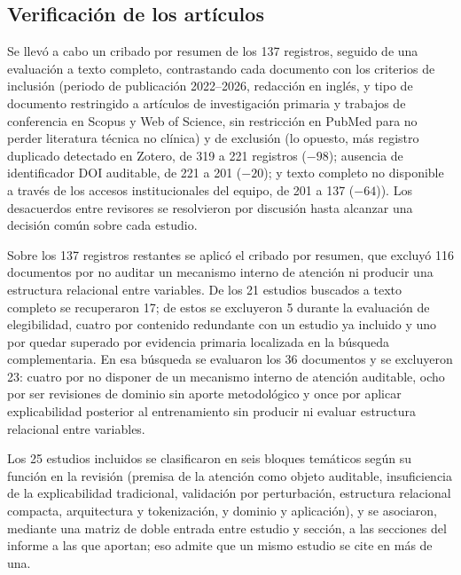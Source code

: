 \subsection{Verificación de los artículos}
\label{subsec:verificacion}

Se llevó a cabo un cribado por resumen de los 137 registros, seguido de una evaluación a texto completo, contrastando cada documento con los criterios de inclusión (periodo de publicación 2022--2026, redacción en inglés, y tipo de documento restringido a artículos de investigación primaria y trabajos de conferencia en Scopus y Web of Science, sin restricción en PubMed para no perder literatura técnica no clínica) y de exclusión (lo opuesto, más registro duplicado detectado en Zotero, de 319 a 221 registros ($-98$); ausencia de identificador DOI auditable, de 221 a 201 ($-20$); y texto completo no disponible a través de los accesos institucionales del equipo, de 201 a 137 ($-64$)). Los desacuerdos entre revisores se resolvieron por discusión hasta alcanzar una decisión común sobre cada estudio.

Sobre los 137 registros restantes se aplicó el cribado por resumen, que excluyó 116 documentos por no auditar un mecanismo interno de atención ni producir una estructura relacional entre variables. De los 21 estudios buscados a texto completo se recuperaron 17; de estos se excluyeron 5 durante la evaluación de elegibilidad, cuatro por contenido redundante con un estudio ya incluido y uno por quedar superado por evidencia primaria localizada en la búsqueda complementaria. En esa búsqueda se evaluaron los 36 documentos y se excluyeron 23: cuatro por no disponer de un mecanismo interno de atención auditable, ocho por ser revisiones de dominio sin aporte metodológico y once por aplicar explicabilidad posterior al entrenamiento sin producir ni evaluar estructura relacional entre variables.

Los 25 estudios incluidos se clasificaron en seis bloques temáticos según su función en la revisión (premisa de la atención como objeto auditable, insuficiencia de la explicabilidad tradicional, validación por perturbación, estructura relacional compacta, arquitectura y tokenización, y dominio y aplicación), y se asociaron, mediante una matriz de doble entrada entre estudio y sección, a las secciones del informe a las que aportan; eso admite que un mismo estudio se cite en más de una.

